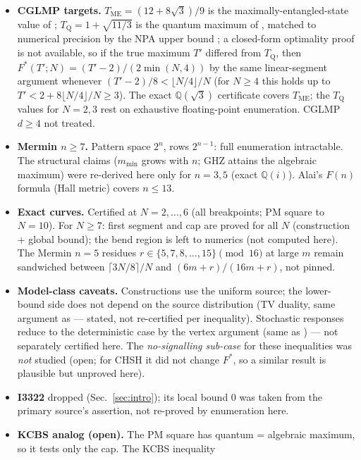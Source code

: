 \documentclass[aps,pra,reprint,superscriptaddress,floatfix]{revtex4-2}
\begin{document}
\begin{itemize}
\item \textbf{{CGLMP} targets.} $T_{\mathrm{ME}}=(12+8\sqrt{3})/9$ is
  the maximally-entangled-state value of \cite{cglmp2002};
  $T_{\mathrm{Q}}=1+\sqrt{11/3}$ is the quantum maximum of \cite{adgl2002},
  matched to numerical precision by the NPA upper bound \cite{npa2008}; a
  closed-form optimality proof is not available, so if the true maximum
  $T'$ differed from $T_{\mathrm{Q}}$, then $F^{*}(T';N)=(T'-2)/(2\min(N,4))$ by the same
  linear-segment argument whenever $(T'-2)/8<\lfloor N/4\rfloor/N$ (for
  $N\ge 4$ this holds up to $T'<2+8\lfloor N/4\rfloor/N\ge 3$). The exact
  $\mathbb{Q}(\sqrt{3})$ certificate covers $T_{\mathrm{ME}}$; the
  $T_{\mathrm{Q}}$ values for $N=2,3$ rest on exhaustive floating-point
  enumeration. {CGLMP} $d\ge 4$ not treated.
\item \textbf{{Mermin} $n\ge 7$.} Pattern space $2^{n}$, rows $2^{n-1}$:
  full enumeration intractable. The structural claims ($m_{\min}$ grows
  with $n$; GHZ attains the algebraic maximum) were re-derived here only
  for $n=3,5$ (exact $\mathbb{Q}(i)$). Alai's $F(n)$ formula (Hall
  metric) covers $n\le 13$.
\item \textbf{Exact curves.} Certified at $N=2,\dots,6$ (all breakpoints;
  PM square to $N=10$). For $N\ge 7$: first segment and cap are proved
  for all $N$ (construction + global bound); the bend region is left to
  numerics (not computed here). The {Mermin} $n=5$ residues
  $r\in\{5,7,8,\dots,15\}\pmod{16}$ at large $m$ remain sandwiched between
  $\lceil 3N/8\rceil/N$ and $(6m+r)/(16m+r)$, not pinned.
\item \textbf{Model-class caveats.} Constructions use the uniform source;
  the lower-bound side does not depend on the source distribution (TV
  duality, same argument as \cite{mainpaper2026} --- stated, not
  re-certified per inequality). Stochastic responses reduce to the
  deterministic case by the vertex argument (same as
  \cite{mainpaper2026}) --- not separately certified here. The
  \emph{no-signalling sub-case} for these inequalities was \emph{not}
  studied (open; for {CHSH} it did not change $F^{*}$, so a similar
  result is plausible but unproved here).
\item \textbf{{I3322}} dropped (Sec.~\ref{sec:intro}); its local bound $0$
  was taken from the primary source's assertion, not re-proved by
  enumeration here.
\item \textbf{{KCBS} analog (open).} The PM square has quantum =
  algebraic maximum, so it tests only the cap. The {KCBS} inequality

\end{itemize}
\end{document}
